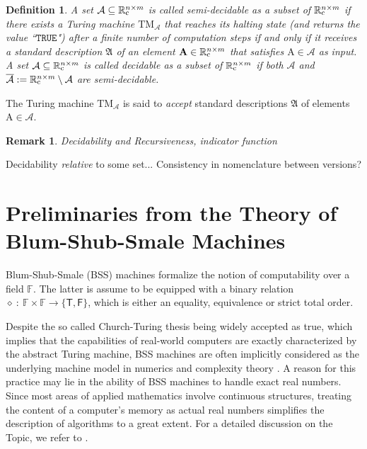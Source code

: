 \documentclass[conference]{IEEEtran}
\def\A{{\mathcal A}}
\def\RR{{\mathbb R}}
\def\FF{{\mathbb F}}
\def\mA{\bm{\mathrm{A}}}
\newcommand{\TM}{\mathrm{TM}}
\newcommand{\RRcP}[1]{\mathrlap{\phantom{\RR}_{\mathrm{c}}}\RR^{#1}}
\newcommand{\sdummy}{{\color{red}[SOURCE]}}
\newcommand{\tbr}[1]{}
\newtheorem{Definition}[Theorem]{Definition}
\newtheorem{Remark}[Theorem]{Remark}
\begin{document}
	\begin{Definition}  \label{semi}
						A set \(\A \subseteq \RRcP{n\times m}\) is called \emph{semi-decidable} as a subset of \(\RRcP{n\times m}\) 
						if there exists a Turing machine \(\TM_{\A}\) that reaches its halting state (and returns the value ``\(\mathtt{TRUE}\)") 
						after a finite number of computation steps if and only if it receives a standard description \(\mathfrak{A}\) of an element 
						\(\mA \in \RRcP{n\times m}\) that satisfies \(\mA\in\A\) as input. A set \(\A \subseteq \RRcP{n\times m}\) is called 
						\emph{decidable} as a subset of \(\RRcP{n\times m}\) if both \(\A\) and \(\overline{\A} := \RRcP{n\times m}\setminus\A\) are semi-decidable.
	\end{Definition} 
	
	\noindent The Turing machine \(\TM_\A\) is said to \emph{accept} standard descriptions \(\mathfrak{A}\) of elements \(\mA\in\A\).
	
	{\color{red} 
	\begin{Remark} Decidability and Recursiveness, indicator function\end{Remark}}
	
	{\color{red} Decidability \emph{relative} to some set... Consistency in nomenclature between versions?}

\section{Preliminaries from the Theory of Blum-Shub-Smale Machines}	\label{sec:PreliminariesBSS}	    	
	\noindent Blum-Shub-Smale (BSS) machines formalize the notion of computability over a field \(\FF\). The latter is assume to be equipped 
	with a binary relation \(\diamond~{:}~\FF \times \FF \rightarrow \{\mathsf{T},\mathsf{F}\}\), which is either an equality, equivalence or strict total order. 
	
	Despite the so called Church-Turing thesis being widely accepted as true, which implies that the capabilities of real-world computers are exactly characterized 
	by the abstract Turing machine, BSS machines are often implicitly considered as the underlying machine model in numerics and complexity theory \tbr{\sdummy}. 
	A reason for this practice may lie in the ability of BSS machines to handle exact real numbers. Since most areas of applied mathematics involve continuous structures, 
	treating the content of a computer's memory as actual real numbers simplifies the description of algorithms to a great extent. For a detailed discussion on the Topic, we refer to \cite{Bl04}.
\end{document}
